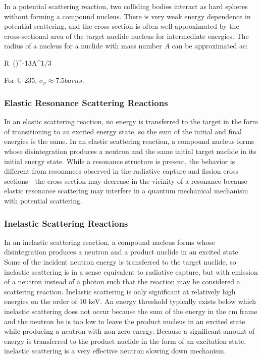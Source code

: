 In a potential scattering reaction, two colliding bodies interact as hard spheres without forming a compound nucleus. There is very weak energy dependence in potential scattering, and the cross section is often well-approximated by the cross-sectional area of the target nuclide nucleus for intermediate energies. The radius of a nucleus for a nuclide with mass number \(A\) can be approximated as:

\beq
R\ ()^{-13}A^{1/3}
\eeq

For U-235, \(\sigma_p\approx7.5 barns\).

\subsubsection{Elastic Resonance Scattering Reactions}

In an elastic scattering reaction, no energy is transferred to the target in the form of transitioning to an excited energy state, so the sum of the initial and final energies is the same. In an elastic scattering reaction, a compound nucleus forms whose disintegration produces a neutron and the same initial target nuclide in its initial energy state. While a resonance structure is present, the behavior is different from resonances observed in the radiative capture and fission cross sections - the cross section may decrease in the vicinity of a resonance because elastic resonance scattering may interfere in a quantum mechanical mechanism with potential scattering.



\subsubsection{Inelastic Scattering Reactions}

In an inelastic scattering reaction, a compound nucleus forms whose disintegration produces a neutron and a product nuclide in an excited state. Some of the incident neutron energy is transferred to the target nuclide, so inelastic scattering is in a sense equivalent to radiative capture, but with emission of a neutron instead of a photon such that the reaction may be considered a scattering reaction. Inelastic scattering is only significant at relatively high energies on the order of 10 keV. An energy threshold typically exists below which inelastic scattering does not occur because the sum of the energy in the \gls{cm} frame and the neutron \gls{be} is too low to leave the product nucleus in an excited state while producing a neutron with non-zero energy. Because a significant amount of energy is transferred to the product nuclide in the form of an excitation state, inelastic scattering is a very effective neutron slowing down mechanism.
